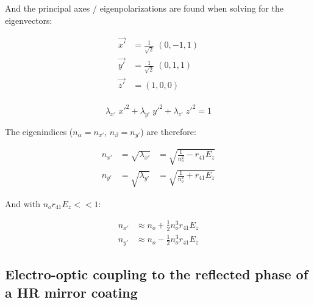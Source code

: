 \noindent And the principal axes / eigenpolarizations are found when solving for the eigenvectors:

\begin{equation}
    \begin{aligned}
	\vec{x'} & = \frac{1}{\sqrt{2}}\;(0, -1, 1) \\ 
	\vec{y'} & = \frac{1}{\sqrt{2}}\;(0, 1, 1) \\
	\vec{z'} & = (1, 0, 0) \\
    \end{aligned}
\end{equation}

\begin{equation}
    \lambda_{x'}\; x'^2 + \lambda_{y'}\; y'^2 + \lambda_{z'}\; z'^2 =1
\end{equation}

\noindent The eigenindices ($n_\alpha = n_{x'}$, $n_\beta = n_{y'}$) are therefore:

\begin{equation}
    \begin{aligned}
	n_{x'} & = \sqrt{\lambda_{x'}} & = \sqrt{\frac{1}{n_o ^2} - r_{41} E_z} \\
	n_{y'} & = \sqrt{\lambda_{y'}} & =  \sqrt{\frac{1}{n_o ^2} + r_{41} E_z}
    \end{aligned}
\end{equation}



\noindent And with $n_o r_{41} E_z << 1$:

\begin{equation}
    \begin{aligned}
	n_{x'} & \approx  n_o + \frac{1}{2} n_o^3 r_{41} E_z \\
	n_{y'} & \approx n_o - \frac{1}{2} n_o^3 r_{41} E_z    
    \end{aligned}
\end{equation}

\subsection{Electro-optic coupling to the reflected phase of a HR mirror coating}


